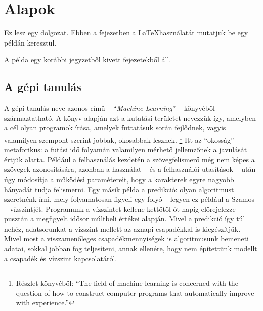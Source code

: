\chapter{Alapok}\label{ch:ALAP}

\begin{osszefoglal}
	Ez lesz egy dolgozat. Ebben a fejezetben a \LaTeX használatát mutatjuk be egy példán keresztül.
	
	A példa egy korábbi jegyzetből kivett fejezetekből áll.
\end{osszefoglal}

\section{A gépi tanulás}\label{sec:ALAP:ml}

A gépi tanulás neve   azonos címû -- ``{\em Machine Learning}'' -- könyvéből származtatható.
A könyv alapján azt a kutatási területet nevezzük így, amelyben a cél olyan programok írása, amelyek  futtatásuk során fejlődnek, vagyis valamilyen szempont szerint jobbak, okosabbak lesznek.%
\footnote{ %
Részlet  könyvéből:\newline
    ``The field of machine learning is concerned with the question of how to construct computer programs    that automatically improve with experience.''
}  %
Itt az ``okosság'' metaforikus: a futási idő folyamán valamilyen mérhető jellemzőnek a javulását értjük alatta.
Például a felhasználás kezdetén a szövegfelismerő még nem képes a szövegek azonosítására, azonban a használat -- és a felhasználói utasítások -- után úgy módosítja a mûködési paramétereit, hogy a karakterek egyre nagyobb hányadát tudja felismerni.
Egy másik példa a predikció: olyan algoritmust szeretnénk írni, mely
folyamatosan figyeli egy folyó -- legyen ez például a Szamos --
vízszintjét. Programunk a vízszintet kellene kettőtől öt napig
előrejelezze pusztán a megfigyelt idősor múltbeli értékei alapján.
Mivel a predikció így túl nehéz, adatsorunkat a vízszint mellett
az aznapi csapadékkal is kiegészítjük. Mivel most a
visszamenőleges csapadékmennyiségek is algoritmusunk bemeneti
adatai, sokkal jobban fog teljesíteni, annak ellenére, hogy nem
építettünk modellt a csapadék és vízszint kapcsolatáról.

